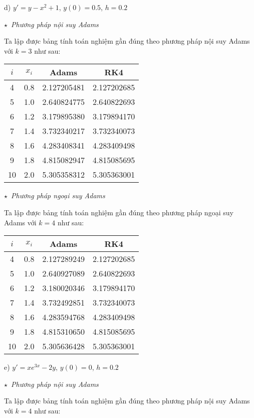 d) $y'=y-x^2+1$, $y(0)=0.5$, $h=0.2$\par

$\star$~\textit{Phương pháp nội suy Adams}\par
Ta lập được bảng tính toán nghiệm gần đúng theo phương pháp nội suy Adams với $k=3$ như sau:

\begin{longtable}{|c|c|c|c|}\hline
$i$&$x_i$&Adams&RK4\\ \hline
\endhead
4  &0.8 &2.127205481 &2.127202685\\ \hline
5  &1.0 &2.640824775 &2.640822693\\ \hline
6  &1.2 &3.179895380 &3.179894170\\ \hline
7  &1.4 &3.732340217 &3.732340073\\ \hline
8  &1.6 &4.283408341 &4.283409498\\ \hline
9  &1.8 &4.815082947 &4.815085695\\ \hline
10 &2.0 &5.305358312 &5.305363001\\ \hline
\end{longtable}

$\star$~\textit{Phương pháp ngoại suy Adams}\par
Ta lập được bảng tính toán nghiệm gần đúng theo phương pháp ngoại suy Adams với $k=4$ như sau:

\begin{longtable}{|c|c|c|c|}
\hline
$i$&$x_i$&Adams&RK4\\ \hline
\endhead
4  &0.8 &2.127289249 &2.127202685\\ \hline
5  &1.0 &2.640927089 &2.640822693\\ \hline
6  &1.2 &3.180020346 &3.179894170\\ \hline
7  &1.4 &3.732492851 &3.732340073\\ \hline
8  &1.6 &4.283594768 &4.283409498\\ \hline
9  &1.8 &4.815310650 &4.815085695\\ \hline
10 &2.0 &5.305636428 &5.305363001\\ \hline
\end{longtable}

e) $y'=xe^{3x}-2y$, $y(0)=0$, $h=0.2$\par

$\star$~\textit{Phương pháp nội suy Adams}\par
Ta lập được bảng tính toán nghiệm gần đúng theo phương pháp nội suy Adams với $k=4$ như sau:

